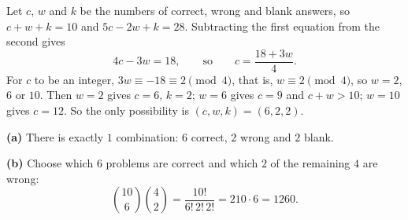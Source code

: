Let $c$, $w$ and $k$ be the numbers of correct, wrong and blank answers, so $c+w+k=10$ and $5c-2w+k=28$. Subtracting the first equation from the second gives
\[4c-3w=18,\qquad\text{so}\qquad c=\dfrac{18+3w}{4}.\]
For $c$ to be an integer, $3w\equiv-18\equiv2\pmod4$, that is, $w\equiv2\pmod4$, so $w=2$, $6$ or $10$. Then $w=2$ gives $c=6$, $k=2$; $w=6$ gives $c=9$ and $c+w>10$; $w=10$ gives $c=12$. So the only possibility is $(c,w,k)=(6,2,2)$.

\textbf{(a)} There is exactly $\boxed{1}$ combination: $6$ correct, $2$ wrong and $2$ blank.

\textbf{(b)} Choose which $6$ problems are correct and which $2$ of the remaining $4$ are wrong:
\[\binom{10}{6}\binom42=\dfrac{10!}{6!\,2!\,2!}=210\cdot6=\boxed{1260}.\]
